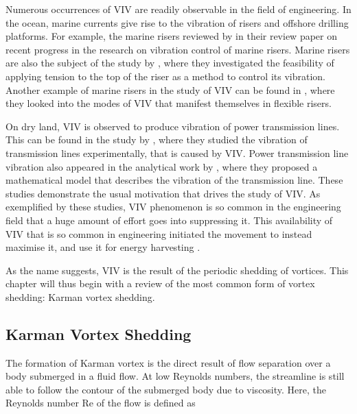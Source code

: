 \documentclass[oneside]{utmthesis}
\begin{document}
Numerous occurrences of VIV are readily observable in the field of engineering. In the ocean, marine currents give rise to the vibration of risers and offshore drilling platforms. For example, the marine risers reviewed by \citet{Liu2020} in their review paper on recent progress in the research on vibration control of marine risers. Marine risers are also the subject of the study by \citet{Zhang2020}, where they investigated the feasibility of applying tension to the top of the riser as a method to control its vibration. Another example of marine risers in the study of VIV can be found in \citet{Meng2020}, where they looked into the modes of VIV that manifest themselves in flexible risers.


On dry land, VIV is observed to produce vibration of power transmission lines. This can be found in the study by \citet{Gomez-Ortega2019a}, where they studied the vibration of transmission lines experimentally, that is caused by VIV. Power transmission line vibration also appeared in the analytical work by \citet{Gomez-Ortega2019b}, where they proposed a mathematical model that describes the vibration of the transmission line. These studies demonstrate the usual motivation that drives the study of VIV. As exemplified by these studies, VIV phenomenon is so common in the engineering field that a huge amount of effort goes into suppressing it. This availability of VIV that is so common in engineering initiated the movement to instead maximise it, and use it for energy harvesting \citep{Barati2022}.

As the name suggests, VIV is the result of the periodic shedding of vortices. This chapter will thus begin with a review of the most common form of vortex shedding: Karman vortex shedding.

\subsection{Karman Vortex Shedding} \label{ssec:kvShedding}
The formation of Karman vortex is the direct result of flow separation over a body submerged in a fluid flow. At low Reynolds numbers, the streamline is still able to follow the contour of the submerged body due to viscosity.  Here, the Reynolds number Re of the flow is defined as
\end{document}
